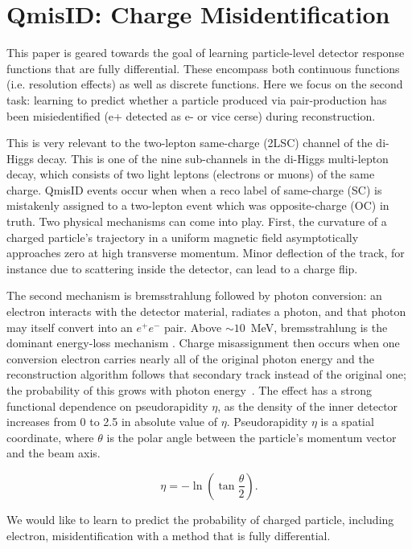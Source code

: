 \section{QmisID: Charge Misidentification}

This paper is geared towards the goal of learning particle-level detector response functions that are fully differential. These encompass both continuous functions (i.e. resolution effects) as well as discrete functions. 
Here we focus on the second task: learning to predict whether a particle produced via pair-production has been misiedentified (e+ detected as e- or vice cerse) during reconstruction. 

This is very relevant to the two-lepton same-charge (2LSC) channel of the di-Higgs decay. This is one of the nine sub-channels in the di-Higgs multi-lepton decay, which consists of two light leptons (electrons or muons) of the same charge. QmisID events occur when when a reco label of same-charge (SC) is mistakenly assigned to a two-lepton event which was opposite-charge (OC) in truth. 
Two physical mechanisms can come into play. First, the curvature of a charged particle's trajectory in a uniform magnetic field asymptotically approaches zero at high transverse momentum. Minor deflection of the track, for instance due to scattering inside the detector, can lead to a charge flip. 

The second mechanism is bremsstrahlung followed by photon conversion:
an electron interacts with the detector material, radiates a photon,
and that photon may itself convert into an \(e^{+}e^{-}\) pair.
Above \(\sim\!10\)~MeV, bremsstrahlung is the dominant energy-loss
mechanism \cite{wichmann2008diplomarbeit}. Charge misassignment then occurs when one conversion
electron carries nearly all of the original photon energy and the
reconstruction algorithm follows that secondary track instead of the
original one; the probability of this grows with photon
energy~\cite{wichmann2008diplomarbeit}. The effect has a strong functional dependence on pseudorapidity \(\eta\), as the density of the inner detector increases from 0 to 2.5 in absolute value of \(\eta\). Pseudorapidity \(\eta\) is a spatial coordinate, where \(\theta\) is the polar angle between the particle's momentum vector and the beam axis.

\begin{equation}
    \eta = -\ln\!\left(\tan\frac{\theta}{2}\right).
\end{equation}

We would like to learn to predict the probability of charged particle, including electron, misidentification with a method that is fully differential.